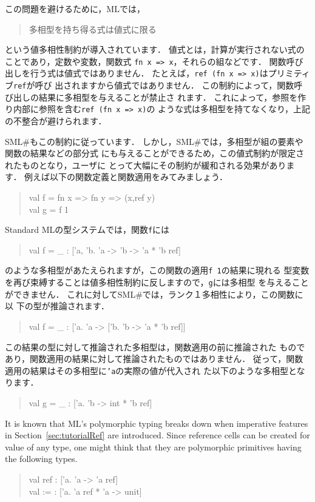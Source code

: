 \documentclass{jbook}
\newcommand{\smlsharp}{SML\#}
\newenvironment{program}{\begin{quote}\begin{tt}}%
                        {\end{tt}\end{quote}}
\begin{document}
	この問題を避けるために，MLでは，
\begin{quote}
多相型を持ち得る式は値式に限る
\end{quote}
という値多相性制約が導入されています．
	値式とは，計算が実行されない式のことであり，定数や変数，関数式
{\tt fn x => x}，それらの組などです．
	関数呼び出しを行う式は値式ではありません．
	たとえば，{\tt ref (fn x => x)}はプリミティブ{\tt ref}が呼び
出されますから値式ではありません．
	この制約によって，関数呼び出しの結果に多相型を与えることが禁止さ
れます．
	これによって，参照を作り内部に参照を含む{\tt ref (fn x => x)}の
ような式は多相型を持てなくなり，上記の不整合が避けられます．

	\smlsharp{}もこの制約に従っています．
	しかし，\smlsharp{}では，多相型が組の要素や関数の結果などの部分式
にも与えることができるため，この値式制約が限定されたものとなり，ユーザに
とって大幅にその制約が緩和される効果があります．
	例えば以下の関数定義と関数適用をみてみましょう．
\begin{program}
val f = fn x => fn y => (x,ref y)\\
val g = f 1\\
\end{program}
	Standard MLの型システムでは，関数{\tt f}には
\begin{program}
val f = \_ : ['a, 'b. 'a -> 'b -> 'a * 'b ref]
\end{program}
のような多相型があたえられますが，この関数の適用{\tt f 1}の結果に現れる
型変数を再び束縛することは値多相性制約に反しますので，{\tt g}には多相型
を与えることができません．
	これに対して\smlsharp{}では，ランク１多相性により，この関数に以
下の型が推論されます．
\begin{program}
val f = \_ : ['a. 'a -> ['b. 'b -> 'a * 'b ref]]
\end{program}
	この結果の型に対して推論された多相型は，関数適用の前に推論された
ものであり，関数適用の結果に対して推論されたものではありません．
	従って，関数適用の結果はその多相型に{\tt 'a}の実際の値が代入され
た以下のような多相型となります．
\begin{program}
val g = \_ :  ['a. 'b -> int * 'b ref]
\end{program}
\else%
	It is known that ML's polymorphic typing breaks down when 
imperative features in Section~\ref{sec:tutorialRef} are introduced.
	Since reference cells can be created for value of any type,
one might think that they are polymorphic primitives having the
following types.
\begin{program}
val ref : ['a. 'a -> 'a ref]\\
val := :  ['a. 'a ref * 'a -> unit]
\end{program}
\end{document}
